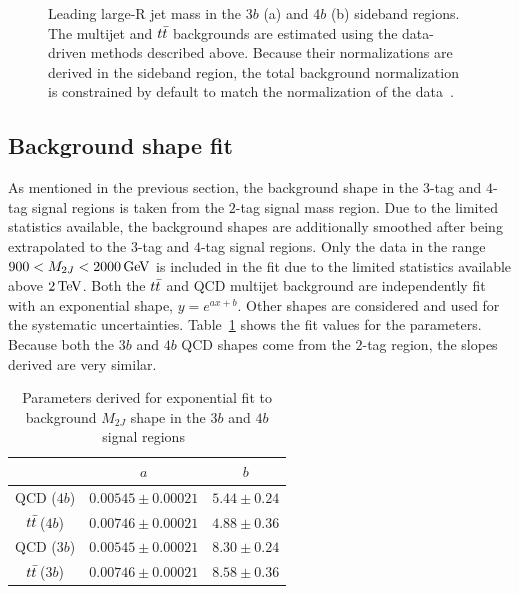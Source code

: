 \begin{figure}[h!]
   \caption{Leading large-R jet mass in the $3b$ (a) and $4b$ (b) sideband regions. The multijet and $t\bar{t}$ backgrounds are estimated using the data-driven methods described above. Because their normalizations are derived in the sideband region, the total background normalization is constrained by default to match the normalization of the data~\cite{4bconf}.}
  \label{fig:4b_sideband}
\end{figure}

\subsection{Background shape fit}

As mentioned in the previous section, the background shape in the $3$-tag and $4$-tag signal regions is taken from the $2$-tag signal mass region. Due to the limited statistics available, the background shapes are additionally smoothed after being extrapolated to the $3$-tag and $4$-tag signal regions. Only the data in the range $900 < M_{2J} < 2000 \GeV$ is included in the fit due to the limited statistics available above $2 \TeV$. Both the $t\bar{t}$ and QCD multijet background are independently fit with an exponential shape, $y = e^{ax+b}$. Other shapes are considered and used for the systematic uncertainties. Table~\ref{tab:shape_fit} shows the fit values for the parameters. Because both the $3b$ and $4b$ QCD shapes come from the $2$-tag region, the slopes derived are very similar. 

\begin{table}[h!]
\centering
\captionsetup{justification=centering}

\hspace{-10pt}
\begin{tabular}{|c|c|c|}
\hline
 & $a$ & $b$ \\ \hline
QCD ($4b$) & $0.00545 \pm 0.00021$ & $5.44 \pm 0.24$ \\ 
$t\bar{t}$\,($4b$) & $0.00746 \pm 0.00021$ & $4.88 \pm 0.36$ \\ \hline
QCD ($3b$) & $0.00545 \pm 0.00021$ & $8.30 \pm 0.24$ \\ 
$t\bar{t}$\,($3b$) & $0.00746 \pm 0.00021$ & $8.58 \pm 0.36$ \\ \hline
\end{tabular}
\caption{
Parameters derived for exponential fit to background $M_{2J}$ shape in the $3b$ and $4b$ signal regions~\cite{Qi}
}
\label{tab:shape_fit}
\end{table}

